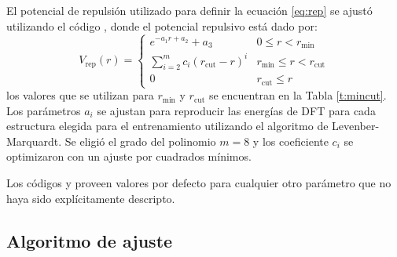 El potencial de repulsión utilizado para definir la ecuación \ref{eq:rep} 
se ajustó utilizando el código  \cite{tango}, donde el potencial 
repulsivo está dado por:
\begin{equation}\label{eq:v_rep}
    V_{\text{rep}}(r) = \begin{cases}
        e^{-a_1r+a_2}+a_3 & 0\le r<r_{\min}\\
        \displaystyle\sum_{i=2}^m c_i\left(r_{\text{cut}}-r\right)^i & r_{\min}\le r < r_{\text{cut}}\\
        0 & r_{\text{cut}} \le r
    \end{cases}
\end{equation}
los valores que se utilizan para $r_{\min}$ y $r_{\text{cut}}$ se encuentran
en la Tabla \ref{t:mincut}. Los parámetros $a_i$ se ajustan para reproducir las 
energías de DFT para cada estructura elegida para el entrenamiento utilizando el 
algoritmo de Levenber-Marquardt. Se eligió el grado del polinomio $m = 8$ y 
los coeficiente $c_i$ se optimizaron con un ajuste por cuadrados mínimos.
\begin{table}[h!]
    \centering
    \caption{Valores de $r_{\min}$ y $r_{\text{cut}}$ utilizados en la ecuación
    \ref{eq:v_rep}}
    \setlength\extrarowheight{2pt}
    \label{t:mincut}
\end{table}

Los códigos  y  proveen valores por defecto para 
cualquier otro parámetro que no haya sido explícitamente descripto. 


\subsection{Algoritmo de ajuste}\label{s:algfit}

